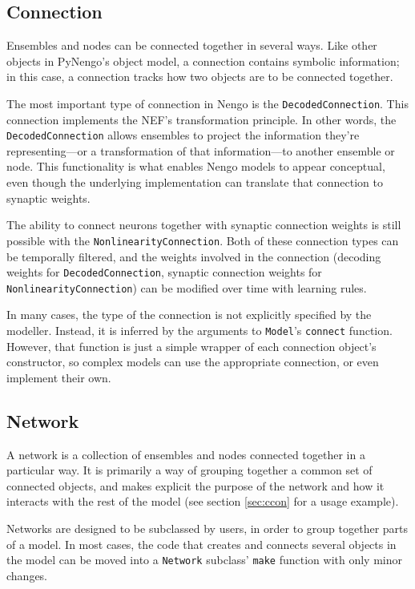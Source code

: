 \documentclass{frontiersSCNS}
\begin{document}
\subsection{Connection}

Ensembles and nodes can be connected together
in several ways.
Like other objects in PyNengo's object model,
a connection contains symbolic information;
in this case, a connection tracks
how two objects are to be connected together.

The most important type of connection
in Nengo is the \texttt{DecodedConnection}.
This connection implements
the NEF's transformation principle.
In other words, the \texttt{DecodedConnection}
allows ensembles to project
the information they're representing---or
a transformation of that information---to
another ensemble or node.
This functionality is what enables Nengo models
to appear conceptual,
even though the underlying implementation
can translate that connection
to synaptic weights.

The ability to connect neurons together
with synaptic connection weights is still possible
with the \texttt{NonlinearityConnection}.
Both of these connection types
can be temporally filtered,
and the weights involved in the connection
(decoding weights for \texttt{DecodedConnection},
synaptic connection weights for \texttt{NonlinearityConnection})
can be modified over time with learning rules.

In many cases, the type of the connection
is not explicitly specified by the modeller.
Instead, it is inferred by the arguments
to \texttt{Model}'s \texttt{connect} function.
However, that function is just a simple wrapper
of each connection object's constructor,
so complex models can use
the appropriate connection,
or even implement their own.

\subsection{Network}

A network is a collection of ensembles and nodes
connected together in a particular way.
It is primarily a way of grouping together
a common set of connected objects,
and makes explicit the purpose
of the network and how it interacts
with the rest of the model
(see section \ref{sec:ccon} for a usage example).

Networks are designed to be
subclassed by users,
in order to group together
parts of a model.
In most cases,
the code that creates and connects
several objects in the model can be
moved into a \texttt{Network}
subclass' \texttt{make}
function with only minor changes.
\end{document}
